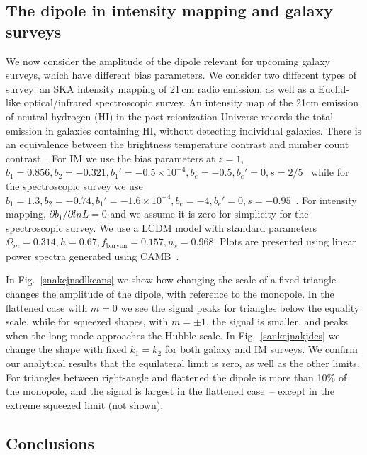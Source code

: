 {\subsection*{The dipole in intensity mapping and galaxy surveys}

We now consider the amplitude of the dipole relevant for upcoming galaxy surveys, which have different bias parameters. We consider two different types of survey: an SKA intensity mapping of 21\,cm radio emission, as well as a Euclid-like optical/infrared spectroscopic survey.
An intensity map of the 21cm emission of neutral hydrogen (HI) in the post-reionization Universe records the total emission in galaxies containing HI, without detecting individual galaxies. There is an equivalence between the brightness temperature contrast and number count contrast~\citep{Umeh:2015gza}. For IM we use the bias parameters at $z=1$, 
$b_1 = 0.856, b_2 = -0.321, b_1' = -0.5\times10^{-4}, b_e = -0.5, b_e'=0, s = 2/5$~\citep{Fonseca:2018hsu,Umeh:2015gza}
while for the spectroscopic survey we use 
$ b_1 = 1.3,b_2 = -0.74, b_1' = -1.6\times10^{-4},  b_e = -4, b_e' = 0, s = -0.95$~\citep{Camera:2018jys,Yankelevich:2018uaz}.
For intensity mapping, $ \partial b_1/\partial ln L =0$ and we assume it is zero for simplicity for the spectroscopic survey. We use a LCDM model with standard parameters $\Omega_m=0.314, h=0.67, f_\text{baryon}=0.157, n_s=0.968$. Plots are presented using linear power spectra generated using CAMB~\citep{Lewis:1999bs}.

In Fig.~\ref{snakcjnsdlkcans} we show how changing the scale of a fixed triangle changes the amplitude of the dipole, with reference to the monopole. In the flattened case with $m=0$ we see the signal peaks for triangles below the equality scale, while for squeezed shapes, with $m=\pm1$, the signal is smaller, and peaks when the long mode approaches the Hubble scale. 
In Fig.~\ref{sankcjnakjdcs} we change the shape with fixed $k_1=k_2$ for both galaxy and IM surveys. We confirm our analytical results that the equilateral limit is zero, as well as the other limits. For triangles between right-angle and flattened the dipole is more than 10\% of the monopole, and the signal is largest in the flattened case~-- except in the extreme squeezed limit (not shown). 


\subsection*{Conclusions}

}

